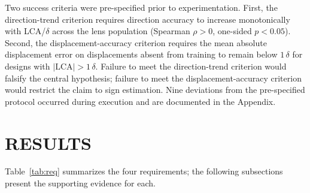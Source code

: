 \documentclass{ieee-ojvt}
\begin{document}
Two success criteria were pre-specified prior to experimentation. First, the direction-trend criterion requires direction accuracy to increase monotonically with LCA/$\delta$ across the lens population (Spearman $\rho>0$, one-sided $p<0.05$). Second, the displacement-accuracy criterion requires the mean absolute displacement error on displacements absent from training to remain below $1\,\delta$ for designs with $|\mathrm{LCA}|>1\,\delta$. Failure to meet the direction-trend criterion would falsify the central hypothesis; failure to meet the displacement-accuracy criterion would restrict the claim to sign estimation.
Nine deviations from the pre-specified protocol occurred during execution and are documented in the Appendix.

\section{RESULTS}
Table~\ref{tab:req} summarizes the four requirements; the following subsections present the supporting evidence for each.
\end{document}
